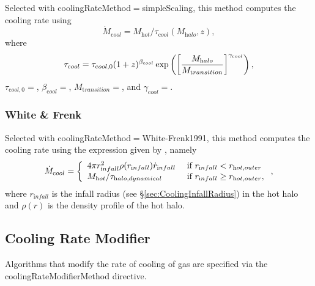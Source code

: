 Selected with {\normalfont \ttfamily coolingRateMethod}$=${\normalfont \ttfamily simpleScaling}, this method computes the cooling rate using
\begin{equation}
\dot{M}_{\mathrm cool} = M_{\mathrm hot}/\tau_{\mathrm cool}(M_{\mathrm halo},z) ,
\end{equation}
where 
\begin{equation}
\tau_{\mathrm cool}=\tau_{\mathrm cool,0} (1+z)^{\beta_{\mathrm cool}} \exp \left(\left[{M_{\mathrm halo} \over M_{\mathrm transition}}\right]^{\gamma_{\mathrm cool}}\right),
\end{equation}
$\tau_{\mathrm cool,0}=${\normalfont \ttfamily [coolingRateSimpleScalingTimescale]}, $\beta_{\mathrm cool}=${\normalfont \ttfamily [coolingRateSimpleScalingTimescaleExponent]}, $M_{\mathrm transition}=${\normalfont \ttfamily [coolingRateSimpleScalingTransitionMass]}, and $\gamma_{\mathrm cool}=${\normalfont \ttfamily [coolingRateSimpleScalingCutoffExponent]}.

\subsubsection{White \& Frenk}

Selected with {\normalfont \ttfamily coolingRateMethod}$=${\normalfont \ttfamily White-Frenk1991}, this method computes the cooling rate using the expression given by \cite{white_galaxy_1991}, namely
\begin{equation}
\dot{M}_{\mathrm cool} = \left\{ \begin{array}{ll} 4 \pi r_{\mathrm infall}^2 \rho(r_{\mathrm infall}) \dot{r}_{\mathrm infall}& \hbox{ if } r_{\mathrm infall} < r_{\mathrm hot, outer} \\ M_{\mathrm hot}/\tau_{\mathrm halo, dynamical} & \hbox{ if } r_{\mathrm infall} \ge r_{\mathrm hot, outer}, \end{array} \right. ,
\end{equation}
where $r_{\mathrm infall}$ is the infall radius (see \S\ref{sec:CoolingInfallRadius}) in the hot halo and $\rho(r)$ is the density profile of the hot halo.

\subsection{Cooling Rate Modifier}\label{sec:CoolingRateModifier}

Algorithms that modify the rate of cooling of gas are specified via the {\normalfont \ttfamily coolingRateModifierMethod} directive.

